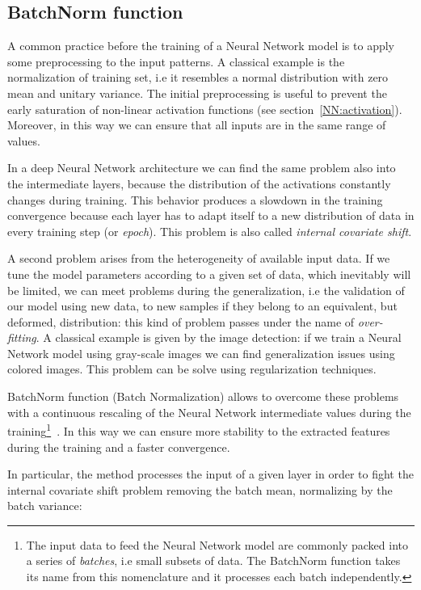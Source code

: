 \documentclass{standalone}
\begin{document}
\subsection[BatchNorm function]{BatchNorm function}\label{NN:batchnorm}

A common practice before the training of a Neural Network model is to apply some preprocessing to the input patterns.
A classical example is the normalization of training set, i.e it resembles a normal distribution with zero mean and unitary variance.
The initial preprocessing is useful to prevent the early saturation of non-linear activation functions (see section~\ref{NN:activation}).
Moreover, in this way we can ensure that all inputs are in the same range of values.

In a deep Neural Network architecture we can find the same problem also into the intermediate layers, because the distribution of the activations constantly changes during training.
This behavior produces a slowdown in the training convergence because each layer has to adapt itself to a new distribution of data in every training step (or \emph{epoch}).
This problem is also called \emph{internal covariate shift}.

A second problem arises from the heterogeneity of available input data.
If we tune the model parameters according to a given set of data, which inevitably will be limited, we can meet problems during the generalization, i.e the validation of our model using new data, to new samples if they belong to an equivalent, but deformed, distribution: this kind of problem passes under the name of \emph{over-fitting}.
A classical example is given by the image detection: if we train a Neural Network model using gray-scale images we can find generalization issues using colored images.
This problem can be solve using regularization techniques.

BatchNorm function (Batch Normalization) allows to overcome these problems with a continuous rescaling of the Neural Network intermediate values during the training\footnote{
  The input data to feed the Neural Network model are commonly packed into a series of \emph{batches}, i.e small subsets of data.
  The BatchNorm function takes its name from this nomenclature and it processes each batch independently.
}~\cite{Sergey2015BatchNorm}.
In this way we can ensure more stability to the extracted features~\cite{Lecun2000EffBackProp} during the training and a faster convergence.

In particular, the method processes the input of a given layer in order to fight the internal covariate shift problem removing the batch mean, normalizing by the batch variance:
\end{document}
